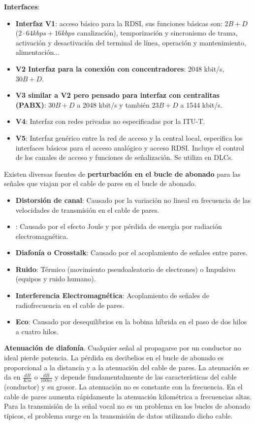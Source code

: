 \documentclass[10pt,portrait, twocolumn]{article}
\begin{document}
\textbf{Interfaces}:

	\begin{itemize}
		\item \textbf{Interfaz V1}: acceso básico para la RDSI, sus funciones básicas son: $2B + D$ ($2 \cdot 64 kbps + 16 kbps$ canalización), temporización y sincronismo de trama, activación y desactivación del terminal de línea, operación y mantenimiento, alimentación... 
		\item \textbf{V2 Interfaz para la conexión con concentradores}: 2048 kbit/s, $30B + D$.
		\item  \textbf{V3 similar a V2 pero pensado para interfaz con centralitas (PABX)}: $30B + D$ a 2048 kbit/s y también $23B+D$ a 1544 kbit/s.
		\item  \textbf{V4}: Interfaz con redes privadas no especificadas por la ITU-T.
		\item  \textbf{V5}: Interfaz genérico entre la red de acceso y la central local, especifica los interfaces básicos para el acceso analógico y acceso RDSI. Incluye el control de los canales de acceso y funciones de señalización. Se utiliza en DLCs.
	\end{itemize}

Existen diversas fuentes de \textbf{perturbación en el bucle de abonado} para las señales que viajan por el cable de pares en el bucle de abonado.

	\begin{itemize}
		\item \textbf{Distorsión de canal}: Causado por la variación no lineal en frecuencia de las velocidades de transmisión en el cable de pares.
		\item {}: Causado por el efecto Joule y por pérdida de energía por radiación electromagnética.
		\item \textbf{Diafonía o Crosstalk}: Causado por el acoplamiento de señales entre pares.
		\item \textbf{Ruido}: Térmico (movimiento pseudoaleatorio de electrones) o Impulsivo (equipos y ruido humano).
		\item \textbf{Interferencia Electromagnética}: Acoplamiento de señales de radiofrecuencia en el cable de pares.
		\item \textbf{Eco}: Causado por desequilibrios en la bobina híbrida en el paso de dos hilos a cuatro hilos.
	\end{itemize}

\textbf{Atenuación de diafonía}. Cualquier señal al propagarse por un conductor no ideal pierde potencia. La pérdida en decibelios en el bucle de abonado es proporcional a la distancia y a la atenuación del cable de pares. La atenuación se da en $\frac{dB}{Km}$ o $\frac{dB}{100 m}$ y depende fundamentalmente de las características del cable (conductor) y su grosor. La atenuación no es constante con la frecuencia. En el cable de pares aumenta rápidamente la atenuación kilométrica a frecuencias altas. Para la transmisión de la señal vocal no es un problema en los bucles de abonado típicos, el problema surge en la transmisión de datos utilizando dicho cable.
\end{document}

